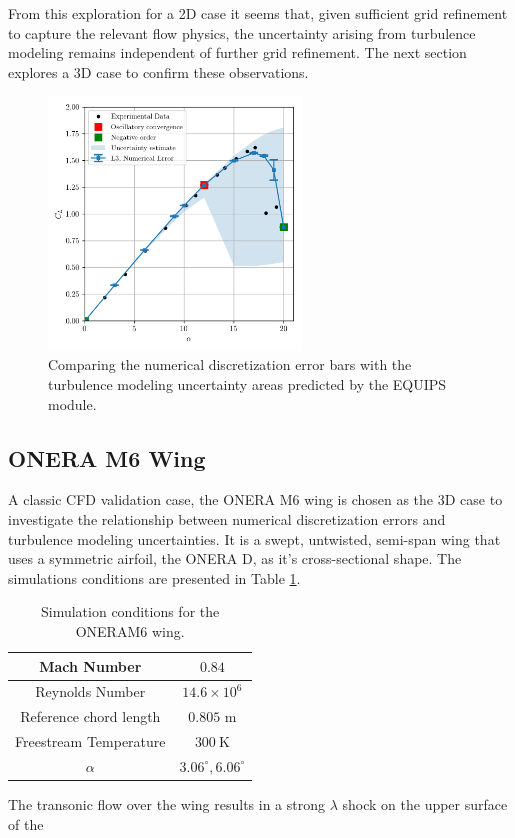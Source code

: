From this exploration for a 2D case it seems that, given sufficient grid refinement to capture the relevant flow physics, the uncertainty arising from turbulence modeling remains independent of further grid refinement. 
The next section explores a 3D case to confirm these observations. 

\begin{figure}
\center
\includegraphics[width=0.6\textwidth]{code/image_gen/naca0012/images/naca0012_CL_vs_alpha_num_uq_L3.png}
\caption{Comparing the numerical discretization error bars with the turbulence modeling uncertainty areas predicted by the EQUIPS module. \label{fig:naca0012_num+turb_uq}}
\end{figure}

\subsection{ONERA M6 Wing}

A classic CFD validation case, the ONERA M6 wing is chosen as the 3D case to investigate the relationship between numerical discretization errors and turbulence modeling uncertainties. 
It is a swept, untwisted, semi-span wing that uses a symmetric airfoil, the ONERA D, as it's cross-sectional shape. 
The simulations conditions are presented in Table \ref{tab:ONERAM6_test_cond}.

\begin{table}
\centering
    \renewcommand{\arraystretch}{1.2}
    \captionsetup{justification=centering}
    \caption{Simulation conditions for the ONERAM6 wing.} 
    \begin{tabular}{|c|c|}
        \hline
        Mach Number & $0.84$ \\ \hline
        Reynolds Number & $14.6\times10^6$ \\ \hline
        Reference chord length & $0.805$ m \\ \hline
        Freestream Temperature & $300~\text{K}$ \\ \hline
        $\alpha$ & $3.06^\circ, 6.06^\circ$ \\ \hline 
    \end{tabular}
    \label{tab:ONERAM6_test_cond}
\end{table}


The transonic flow over the wing results in a strong $\lambda$ shock on the upper surface of the 